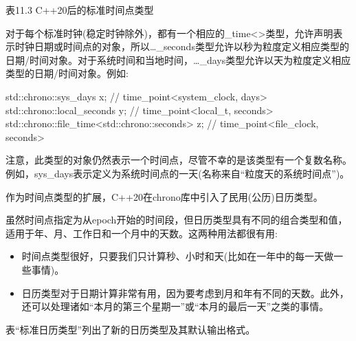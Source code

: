 \begin{center}
表11.3 C++20后的标准时间点类型
\end{center}

对于每个标准时钟(稳定时钟除外)，都有一个相应的\_time<>类型，允许声明表示时钟日期或时间点的对象，所以…\_seconds类型允许以秒为粒度定义相应类型的日期/时间对象。对于系统时间和当地时间，…\_days类型允许以天为粒度定义相应类型的日期/时间对象。例如:

\begin{cpp}
std::chrono::sys_days x; // time_point<system_clock, days>
std::chrono::local_seconds y; // time_point<local_t, seconds>
std::chrono::file_time<std::chrono::seconds> z; // time_point<file_clock, seconds>
\end{cpp}

注意，此类型的对象仍然表示一个时间点，尽管不幸的是该类型有一个复数名称。例如，sys\_days表示定义为系统时间点的一天(名称来自“粒度天的系统时间点”)。


作为时间点类型的扩展，C++20在chrono库中引入了民用(公历)日历类型。

虽然时间点指定为从epoch开始的时间段，但日历类型具有不同的组合类型和值，适用于年、月、工作日和一个月中的天数。这两种用法都很有用:

\begin{itemize}
\item 
时间点类型很好，只要我们只计算秒、小时和天(比如在一年中的每一天做一些事情)。

\item 
日历类型对于日期计算非常有用，因为要考虑到月和年有不同的天数。此外，还可以处理诸如“本月的第三个星期一”或“本月的最后一天”之类的事情。
\end{itemize}

表“标准日历类型”列出了新的日历类型及其默认输出格式。

